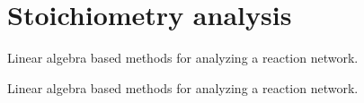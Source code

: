 \hypertarget{group__matrix}{
\section{\-Stoichiometry analysis}
\label{group__matrix}
}


\-Linear algebra based methods for analyzing a reaction network.  


\-Linear algebra based methods for analyzing a reaction network. 